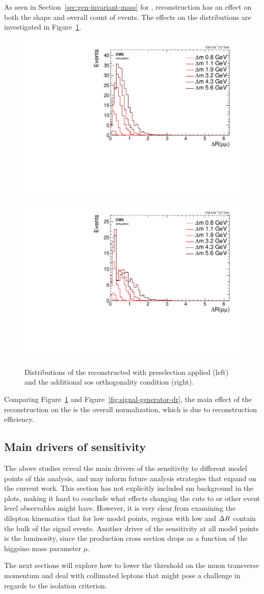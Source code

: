 As seen in Section~\ref{sec:gen-invariant-mass} for \mmumu, reconstruction has an effect on both the shape and overall count of events. The effects on the \drmm distributions are investigated in Figure~\ref{fig:reco-signal-dr}.

\begin{figure}[!htb]
\centering
\includegraphics[width=0.48\linewidth]{plots/signal_muons/none_deltaRCorrJetNoMultIso10Dr0.6.pdf} \,
\includegraphics[width=0.48\linewidth]{plots/signal_muons/none_deltaRCorrJetNoMultIso10Dr0.6_orth.pdf}  \\
\caption[Distributions of the reconstructed \drmm in signal events]{ Distributions of the reconstructed \drmm with preselection applied (left) and the additional \gls{sos} orthogonality condition (right).}
\label{fig:reco-signal-dr}
\end{figure}

Comparing Figure~\ref{fig:reco-signal-dr} and Figure~\ref{fig:signal-generator-dr}, the main effect of the reconstruction on the \drmm is the overall normalization, which is due to reconstruction efficiency.

\clearpage 
\subsection{Main drivers of sensitivity}

The above studies reveal the main drivers of the sensitivity to different model points of this analysis, and may inform future analysis strategies that expand on the current work. This section has not explicitly included \gls{sm} background in the plots, making it hard to conclude what effects changing the cuts to \MET or other event level observables might have. However, it is very clear from examining the dilepton kinematics that for low \dm model points, regions with low \pt and $\Delta R$ contain the bulk of the signal events. Another driver of the sensitivity at all \dm model points is the luminosity, since the production cross section drops as a function of the higgsino mass parameter $\mu$.

The next sections will explore how to lower the threshold on the muon transverse momentum and deal with collimated leptons that might pose a challenge in regards to the isolation criterion.

